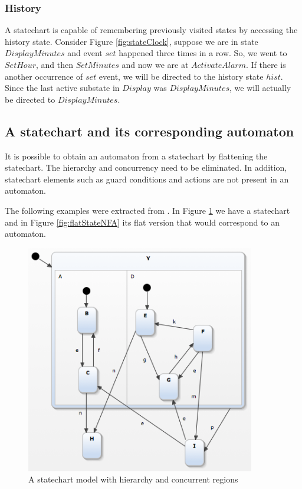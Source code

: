 \subsubsection{History}

A statechart is capable of remembering previously visited states by accessing the history state. Consider Figure \ref{fig:stateClock}, suppose we are in state $DisplayMinutes$ and event $set$ happened three times in a row. So, we went to $SetHour$, and then $SetMinutes$ and now we are at $ActivateAlarm$. If there is another occurrence of $set$ event, we will be directed to the history state $hist$. Since the last active substate in $Display$ was $DisplayMinutes$, we will actually be directed to $DisplayMinutes$.

\subsection{A statechart and its corresponding automaton}
\label{flattening}

It is possible to obtain an automaton from a statechart by flattening the statechart. The hierarchy and concurrency need to be eliminated. In addition, statechart elements such as guard conditions and actions are not present in an automaton. 

The following examples were extracted from \cite{harel87:semantics_statecharts}. In Figure \ref{fig:stateFlat} we have a statechart and in Figure \ref{fig:flatStateNFA} its flat version that would correspond to an automaton.

\begin{figure}[htb]
\centering
\includegraphics[width=10cm]{figuras/statechartExample2}
\caption{\label{fig:stateFlat} A statechart model with hierarchy and concurrent regions}
\end{figure}

